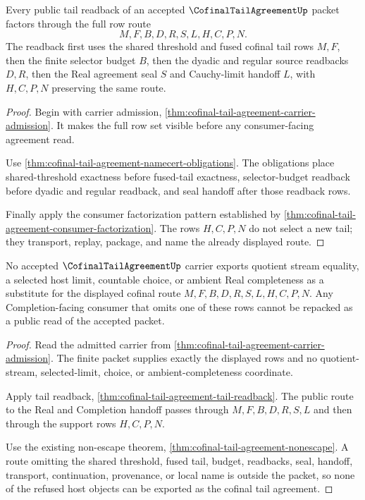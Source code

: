 \begin{theorem}
\label{thm:cofinal-tail-agreement-tail-readback}
Every public tail readback of an accepted $\CofinalTailAgreementUp$ packet factors through the full row route
$$
M,F,B,D,R,S,L,H,C,P,N.
$$
The readback first uses the shared threshold and fused cofinal tail rows $M,F$, then the finite selector budget $B$, then the dyadic and regular source readbacks $D,R$, then the Real agreement seal $S$ and Cauchy-limit handoff $L$, with $H,C,P,N$ preserving the same route.
\end{theorem}
\begin{proof}
Begin with carrier admission, \autoref{thm:cofinal-tail-agreement-carrier-admission}. It makes the full row set visible before any consumer-facing agreement read.

Use \autoref{thm:cofinal-tail-agreement-namecert-obligations}. The obligations place shared-threshold exactness before fused-tail exactness, selector-budget readback before dyadic and regular readback, and seal handoff after those readback rows.

Finally apply the consumer factorization pattern established by \autoref{thm:cofinal-tail-agreement-consumer-factorization}. The rows $H,C,P,N$ do not select a new tail; they transport, replay, package, and name the already displayed route.
\end{proof}

\begin{theorem}
\label{thm:cofinal-tail-agreement-cofinal-nonescape}
No accepted $\CofinalTailAgreementUp$ carrier exports quotient stream equality, a selected host limit, countable choice, or ambient Real completeness as a substitute for the displayed cofinal route $M,F,B,D,R,S,L,H,C,P,N$. Any Completion-facing consumer that omits one of these rows cannot be repacked as a public read of the accepted packet.
\end{theorem}
\begin{proof}
Read the admitted carrier from \autoref{thm:cofinal-tail-agreement-carrier-admission}. The finite packet supplies exactly the displayed rows and no quotient-stream, selected-limit, choice, or ambient-completeness coordinate.

Apply tail readback, \autoref{thm:cofinal-tail-agreement-tail-readback}. The public route to the Real and Completion handoff passes through $M,F,B,D,R,S,L$ and then through the support rows $H,C,P,N$.

Use the existing non-escape theorem, \autoref{thm:cofinal-tail-agreement-nonescape}. A route omitting the shared threshold, fused tail, budget, readbacks, seal, handoff, transport, continuation, provenance, or local name is outside the packet, so none of the refused host objects can be exported as the cofinal tail agreement.
\end{proof}

